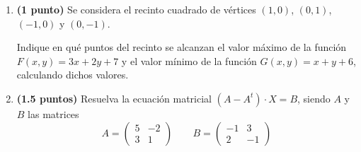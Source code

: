 
\begin{enumerate}[label=\alph*)]
  \item \textbf{(1 punto)} Se considera el recinto cuadrado de vértices
  $(1,0)$, $(0,1)$, $(-1,0)$ y $(0,-1)$.

  Indique en qué puntos del recinto se alcanzan el valor máximo de la función
  $F(x,y)=3x+2y+7$ y el valor mínimo de la función $G(x,y)=x+y+6$,
  calculando dichos valores.
  \item \textbf{(1.5 puntos)} Resuelva la ecuación matricial
  $(A-A^t)\cdot X=B$, siendo $A$ y $B$ las matrices
  \[
    A=\begin{pmatrix}5&-2\\3&1\end{pmatrix}
    \qquad B=\begin{pmatrix}-1&3\\2&-1\end{pmatrix}
  \]
\end{enumerate}
